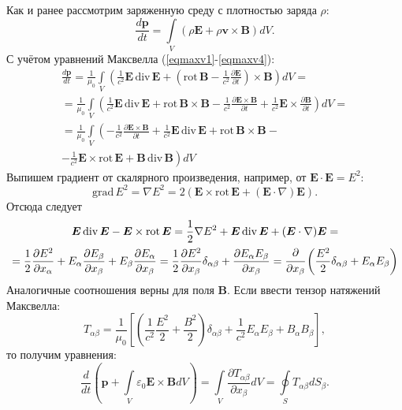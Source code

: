 \documentclass[a4paper,14pt]{extreport} %
\newcommand{\df}[1]{\cfrac{\partial}{\partial #1}}
\newcommand{\dff}[2]{\frac{\partial #1}{\partial #2}}
\newcommand{\Df}[1]{\frac{d}{d #1}}
\newcommand{\Dff}[2]{\frac{d #1}{d #2}}
\renewcommand{\vec}[1]{\bm{#1}}
\renewcommand{\div}{\mathrm{div}\,}
\newcommand{\rot}{\mathrm{rot}\,}
\newcommand{\grad}{\mathrm{grad}\,}
\newcommand{\eps}{\varepsilon}
\begin{document}
	Как и ранее рассмотрим заряженную среду с плотностью заряда $\rho$:
	\begin{equation*}
		\Dff{\vec{p}}{t} = \int\limits_{V} (\rho \vec{E} + \rho \vec{v}\times\vec{B} ) dV.
	\end{equation*}
	С учётом уравнений Максвелла (\ref{eqmaxv1}-\ref{eqmaxv4}):
	\begin{gather*}
		\Dff{\vec{p}}{t} = 
		\frac{1}{\mu_0}\int\limits_{V} \left( \frac{1}{c^2} \vec{E}\, \div \vec{E} + \left(\rot \vec{B} - \frac{1}{c^2} \dff{\vec{E}}{t} \right)\times\vec{B} \right) dV = \\ 
		= 
		\frac{1}{\mu_0}\int\limits_{V} \left( \frac{1}{c^2} \vec{E}\, \div \vec{E} + \rot \vec{B}\times\vec{B} - \frac{1}{c^2} \dff{\vec{E}\times\vec{B}}{t} +  \frac{1}{c^2} \vec{E}\times\dff{\vec{B}}{t} \right) dV = \\
		= 
		\frac{1}{\mu_0}\int\limits_{V} \left( - \frac{1}{c^2} \dff{\vec{E}\times\vec{B}}{t} + \frac{1}{c^2} \vec{E}\, \div \vec{E} + \rot \vec{B}\times\vec{B} - \right. \\ 
		\left. -  \frac{1}{c^2} \vec{E}\times\rot \vec{E} + \vec{B}\,\div \vec{B} \right) dV
	\end{gather*}
	Выпишем градиент от скалярного произведения, например, от $\vec{E}\cdot\vec{E} = E^2$:
	\begin{equation*}
		\grad E^2 = \nabla E^2 = 2 (\vec{E} \times \rot \vec{E} + (\vec{E}\cdot\nabla)\vec{E}).
	\end{equation*}
	Отсюда следует
	\begin{gather*}
		\vec{E}\, \div \vec{E} - \vec{E}\times\rot \vec{E} = \frac{1}{2} \nabla E^2 + \vec{E}\, \div \vec{E} + (\vec{E}\cdot\nabla)\vec{E} = \\
		= \frac{1}{2} \dff{E^2}{x_\alpha} + E_\alpha\dff{E_\beta}{x_\beta} + E_\beta\dff{E_\alpha}{x_\beta} = 
		\frac{1}{2} \dff{E^2}{x_\beta}\delta_{\alpha\beta} + \dff{E_\alpha E_\beta}{x_\beta} = 
		\df{x_\beta} 
		\left(
			\frac{E^2}{2}\delta_{\alpha\beta} + E_\alpha E_\beta
		\right)
	\end{gather*}
	Аналогичные соотношения верны для поля $\vec{B}$. Если ввести тензор натяжений Максвелла:
	\begin{equation*}
		T_{\alpha\beta} = \frac{1}{\mu_0} \left[ \left(\frac{1}{c^2}\frac{E^2}{2} + \frac{B^2}{2}\right)\delta_{\alpha\beta} + \frac{1}{c^2}E_\alpha E_\beta + B_\alpha B_\beta\right],
	\end{equation*}
	то получим уравнения:
	\begin{equation*}
		\Df{t} \left(\vec{p} + \int\limits_{V} \eps_0 \vec{E}\times\vec{B} dV\right) =
		\int\limits_{V} \dff{T_{\alpha\beta}}{x_\beta} dV = \oint\limits_{S} T_{\alpha\beta} dS_\beta.
	\end{equation*}
\end{document}
